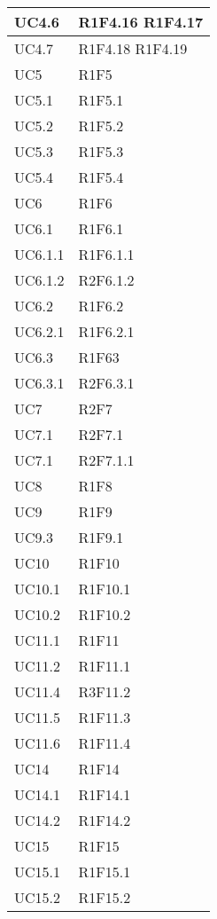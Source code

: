 \begin{center}
\begin{longtable}{|p{44mm}|p{22mm}|}
UC4.6&  
	R1F4.16  \newline
	R1F4.17  	
  \\
\hline
UC4.7& 
	R1F4.18  \newline
	R1F4.19	 
  \\
\hline
UC5& R1F5 \\
\hline
UC5.1& R1F5.1 \\
\hline
UC5.2& R1F5.2  \\
\hline
UC5.3& R1F5.3\\
\hline
UC5.4& R1F5.4 \\
\hline
UC6& R1F6 \\
\hline
UC6.1& R1F6.1 \\
\hline
UC6.1.1& R1F6.1.1 \\
\hline
UC6.1.2& R2F6.1.2 \\
\hline
UC6.2& R1F6.2 \\
\hline
UC6.2.1& R1F6.2.1 \\
\hline
UC6.3& R1F63 \\
\hline
UC6.3.1& R2F6.3.1 \\
\hline
UC7& R2F7\\
\hline
UC7.1& R2F7.1\\
\hline
UC7.1& R2F7.1.1\\
\hline
UC8& R1F8\\
\hline
UC9& R1F9\\
\hline
UC9.3& R1F9.1\\
\hline
UC10& R1F10\\
\hline
UC10.1& R1F10.1\\
\hline
UC10.2& R1F10.2\\
\hline
UC11.1& R1F11\\
\hline
UC11.2& R1F11.1\\
\hline
UC11.4& R3F11.2\\
\hline
UC11.5& R1F11.3\\
\hline
UC11.6& R1F11.4\\
\hline
UC14& R1F14\\
\hline
UC14.1& R1F14.1 \\
\hline
UC14.2& R1F14.2 \\
\hline
UC15&R1F15 \\
\hline
UC15.1& R1F15.1\\
\hline
UC15.2&R1F15.2 \\
\hline	
	\end{longtable}
\end{center}

